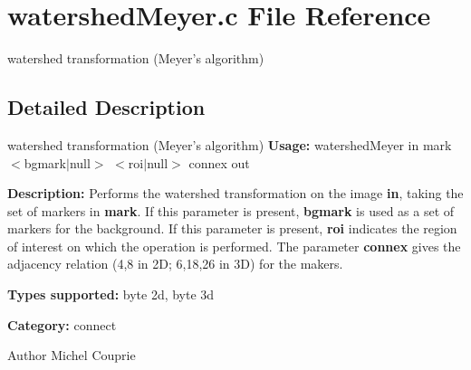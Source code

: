 \section{watershedMeyer.c File Reference}
\label{watershedMeyer_8c}


watershed transformation (Meyer's algorithm)  




\subsection{Detailed Description}
watershed transformation (Meyer's algorithm) {\bfseries Usage:} watershedMeyer in mark $<$bgmark$|$null$>$ $<$roi$|$null$>$ connex out

{\bfseries Description:} Performs the watershed transformation on the image {\bfseries in}, taking the set of markers in {\bfseries mark}. If this parameter is present, {\bfseries bgmark} is used as a set of markers for the background. If this parameter is present, {\bfseries roi} indicates the region of interest on which the operation is performed. The parameter {\bfseries connex} gives the adjacency relation (4,8 in 2D; 6,18,26 in 3D) for the makers.

{\bfseries Types supported:} byte 2d, byte 3d

{\bfseries Category:} connect

\begin{DoxyAuthor}{Author}
Michel Couprie 
\end{DoxyAuthor}
